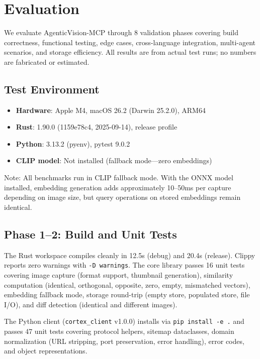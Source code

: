 \documentclass[10pt, twocolumn]{article}
\begin{document}
\section{Evaluation}
\label{sec:eval}

We evaluate AgenticVision-MCP through 8 validation phases covering build correctness, functional testing, edge cases, cross-language integration, multi-agent scenarios, and storage efficiency. All results are from actual test runs; no numbers are fabricated or estimated.

\subsection{Test Environment}

\begin{itemize}[nosep,leftmargin=*]
\item \textbf{Hardware}: Apple M4, macOS 26.2 (Darwin 25.2.0), ARM64
\item \textbf{Rust}: 1.90.0 (1159e78c4, 2025-09-14), release profile
\item \textbf{Python}: 3.13.2 (pyenv), pytest 9.0.2
\item \textbf{CLIP model}: Not installed (fallback mode---zero embeddings)
\end{itemize}

Note: All benchmarks run in CLIP fallback mode. With the ONNX model installed, embedding generation adds approximately 10--50ms per capture depending on image size, but query operations on stored embeddings remain identical.

\subsection{Phase 1--2: Build and Unit Tests}

The Rust workspace compiles cleanly in 12.5s (debug) and 20.4s (release). Clippy reports zero warnings with \texttt{-D warnings}. The core library passes 16 unit tests covering image capture (format support, thumbnail generation), similarity computation (identical, orthogonal, opposite, zero, empty, mismatched vectors), embedding fallback mode, storage round-trip (empty store, populated store, file I/O), and diff detection (identical and different images).

The Python client (\texttt{cortex\_client} v1.0.0) installs via \texttt{pip install -e .} and passes 47 unit tests covering protocol helpers, sitemap dataclasses, domain normalization (URL stripping, port preservation, error handling), error codes, and object representations.
\end{document}
